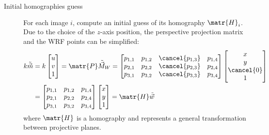 \begin{description}
    \item[Initial homographies guess]
        For each image $i$, compute an initial guess of its homography $\matr{H}_i$.
        Due to the choice of the $z$-axis position, the perspective projection matrix and the WRF points can be simplified:
        \[ 
            \begin{split}
                k \tilde{\vec{m}} &= 
                k \begin{bmatrix} u \\ v \\ 1 \end{bmatrix} =
                \matr{P} \tilde{\vec{M}}_W =
                \begin{bmatrix}
                    p_{1,1} & p_{1,2} & \cancel{p_{1,3}} & p_{1,4} \\
                    p_{2,1} & p_{2,2} & \cancel{p_{2,3}} & p_{2,4} \\
                    p_{3,1} & p_{3,2} & \cancel{p_{3,3}} & p_{3,4}
                \end{bmatrix}
                \begin{bmatrix} x \\ y \\ \cancel{0} \\ 1 \end{bmatrix} \\
                &= \begin{bmatrix}
                    p_{1,1} & p_{1,2} & p_{1,4} \\
                    p_{2,1} & p_{2,2} & p_{2,4} \\
                    p_{3,1} & p_{3,2} & p_{3,4}
                \end{bmatrix}
                \begin{bmatrix} x \\ y \\ 1 \end{bmatrix} =
                \matr{H}\tilde{\vec{w}}
            \end{split}
        \]
        where $\matr{H}$ is a homography and represents a general transformation between projective planes.


\end{description}
